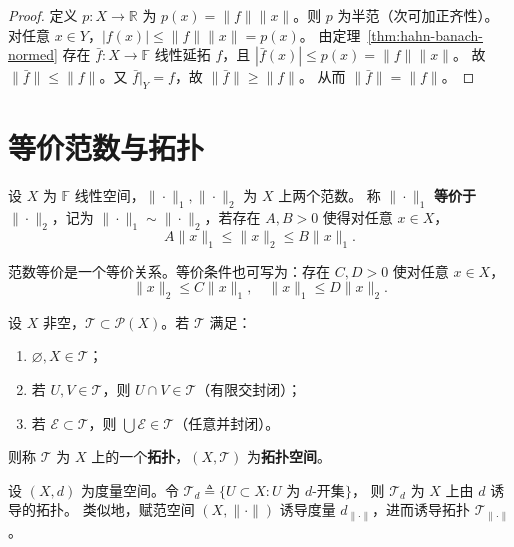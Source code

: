 \documentclass[lang=cn,a4paper,newtx,section]{elegantbook}
\begin{document}
\begin{proof}
  定义 $p:X\to\mathbb{R}$ 为 $p(x)=\|f\|\|x\|$。则 $p$ 为半范（次可加正齐性）。
  对任意 $x\in Y$，$|f(x)|\le\|f\|\|x\|=p(x)$。
  由定理~\ref{thm:hahn-banach-normed} 存在 $\bar{f}:X\to\mathbb{F}$ 线性延拓 $f$，且 $|\bar{f}(x)|\le p(x)=\|f\|\|x\|$。
  故 $\|\bar{f}\|\le\|f\|$。又 $\bar{f}|_Y=f$，故 $\|\bar{f}\|\ge\|f\|$。
  从而 $\|\bar{f}\|=\|f\|$。
\end{proof}

\section{等价范数与拓扑}

\begin{definition}[等价范数]
  设 $X$ 为 $\mathbb{F}$ 线性空间，$\|\cdot\|_1,\|\cdot\|_2$ 为 $X$ 上两个范数。
  称 $\|\cdot\|_1$ \textbf{等价于} $\|\cdot\|_2$，记为 $\|\cdot\|_1\sim\|\cdot\|_2$，若存在 $A,B>0$ 使得对任意 $x\in X$，
  \[
    A\|x\|_1\le\|x\|_2\le B\|x\|_1.
  \]
\end{definition}

\begin{remark}
  范数等价是一个等价关系。等价条件也可写为：存在 $C,D>0$ 使对任意 $x\in X$，
  \[
    \|x\|_2\le C\|x\|_1,\quad\|x\|_1\le D\|x\|_2.
  \]
\end{remark}

\begin{definition}[拓扑]
  设 $X$ 非空，$\mathcal{T}\subset\mathcal{P}(X)$。若 $\mathcal{T}$ 满足：
  \begin{enumerate}
    \item $\varnothing,X\in\mathcal{T}$；
    \item 若 $U,V\in\mathcal{T}$，则 $U\cap V\in\mathcal{T}$（有限交封闭）；
    \item 若 $\mathcal{E}\subset\mathcal{T}$，则 $\bigcup\mathcal{E}\in\mathcal{T}$（任意并封闭）。
  \end{enumerate}
  则称 $\mathcal{T}$ 为 $X$ 上的一个\textbf{拓扑}，$(X,\mathcal{T})$ 为\textbf{拓扑空间}。
\end{definition}

\begin{remark}
  设 $(X,d)$ 为度量空间。令 $\mathcal{T}_d\triangleq\{U\subset X:U\text{ 为 }d\text{-开集}\}$，
  则 $\mathcal{T}_d$ 为 $X$ 上由 $d$ 诱导的拓扑。
  类似地，赋范空间 $(X,\|\cdot\|)$ 诱导度量 $d_{\|\cdot\|}$，进而诱导拓扑 $\mathcal{T}_{\|\cdot\|}$。
\end{remark}
\end{document}
